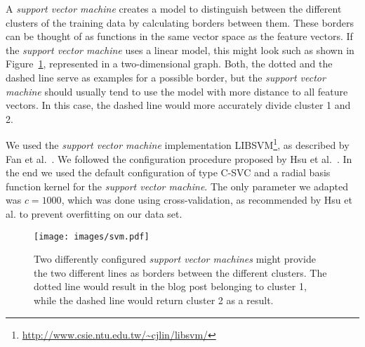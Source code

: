 A \textit{support vector machine} creates a model to distinguish between the different clusters of the training data by calculating borders between them.
These borders can be thought of as functions in the same vector space as the feature vectors.
If the \textit{support vector machine} uses a linear model, this might look such as shown in Figure~\ref{fig:svm}, represented in a two-dimensional graph.
Both, the dotted and the dashed line serve as examples for a possible border, but the \textit{support vector machine} should usually tend to use the model with more distance to all feature vectors.
In this case, the dashed line would more accurately divide cluster 1 and 2.


We used the \textit{support vector machine} implementation LIBSVM\footnote{\url{http://www.csie.ntu.edu.tw/~cjlin/libsvm/}}, as described by Fan et al.~\cite{fan2005working}.
We followed the configuration procedure proposed by Hsu et al.~\cite{hsu2003practical}.
In the end we used the default configuration of type C-SVC and a radial basis function kernel for the \textit{support vector machine}.
The only parameter we adapted was $c=1000$, which was done using cross-validation, as recommended by Hsu et al. to prevent overfitting on our data set.


\begin{figure}[ht!]
    \centering
    \texttt{[image: images/svm.pdf]}
    \caption{Two differently configured \textit{support vector machines} might provide the two different lines as borders between the different clusters. The dotted line would result in the blog post belonging to cluster 1, while the dashed line would return cluster 2 as a result.}
    \label{fig:svm}
\end{figure}

